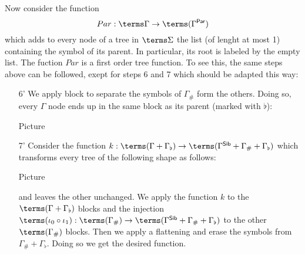 \begin{example}
\medskip
Now consider the function $$Par:\terms\Gamma\to \terms (\Gamma^{\sf{Par}})$$ which adds to every node of a tree in $\terms \Sigma$ the list (of lenght at most 1) containing the symbol of its parent. In particular, its root is labeled by the empty list. 
The fuction $Par$ is a first order tree function. To see this, the same steps above can be followed, exept for steps 6 and 7 which should be adapted this way:
\begin{enumerate}
\item[6'] We apply block to separate the symbols of $\Gamma_\#$ form the others. Doing so, every $\Gamma$ node ends up in the same block as its parent (marked with $\flat$):
\begin{center}
Picture
\end{center}
\item[7'] Consider the function $k:\terms(\Gamma+\Gamma_\flat)\to \terms(\Gamma^{\sf{Sib}}+\Gamma_\#+\Gamma_\flat)$ which transforms every tree of the following shape as follows:
\begin{center}
Picture
\end{center}
and leaves the other unchanged. We apply the function $k$ to the $\terms(\Gamma+\Gamma_\flat)$
blocks and the injection $\terms (\iota_0\circ \iota_1):\terms(\Gamma_\#)\to \terms(\Gamma^{\sf{Sib}}+\Gamma_\#+\Gamma_\flat)$ to the other $\terms(\Gamma_\#)$ blocks. Then we apply a flattening and erase the symbols from $\Gamma_\#+\Gamma_\flat$. Doing so we get the desired function.
\end{enumerate} 
\end{example}



